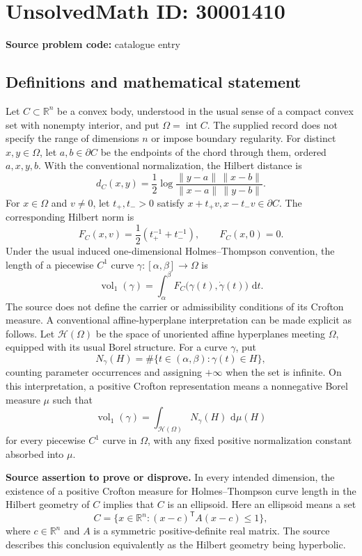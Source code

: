 \documentclass[11pt]{article}
\newcommand{\R}{\mathbb{R}}
\newcommand{\dd}{\,\mathrm{d}}
\begin{document}
\section*{UnsolvedMath ID: 30001410}
\textbf{Source problem code:} catalogue entry
\subsection{Definitions and mathematical statement}
Let \(C\subset\R^n\) be a convex body, understood in the usual sense of a compact convex set with nonempty interior, and put \(\Omega=\operatorname{int}C\). The supplied record does not specify the range of dimensions \(n\) or impose boundary regularity. For distinct \(x,y\in\Omega\), let \(a,b\in\partial C\) be the endpoints of the chord through them, ordered \(a,x,y,b\). With the conventional normalization, the Hilbert distance is
\[
 d_C(x,y)=\frac12\log\frac{\lVert y-a\rVert\,\lVert x-b\rVert}{\lVert x-a\rVert\,\lVert y-b\rVert}.
\]
For \(x\in\Omega\) and \(v\ne0\), let \(t_+,t_->0\) satisfy \(x+t_+v,x-t_-v\in\partial C\). The corresponding Hilbert norm is
\[
 F_C(x,v)=\frac12\left(t_+^{-1}+t_-^{-1}\right),\qquad F_C(x,0)=0.
\]
Under the usual induced one-dimensional Holmes--Thompson convention, the length of a piecewise \(C^1\) curve \(\gamma:[\alpha,\beta]\to\Omega\) is
\[
 \operatorname{vol}_1(\gamma)=\int_\alpha^\beta F_C\bigl(\gamma(t),\dot\gamma(t)\bigr)\,\dd t.
\]
The source does not define the carrier or admissibility conditions of its Crofton measure. A conventional affine-hyperplane interpretation can be made explicit as follows. Let \(\mathcal H(\Omega)\) be the space of unoriented affine hyperplanes meeting \(\Omega\), equipped with its usual Borel structure. For a curve \(\gamma\), put
\[
 N_\gamma(H)=\#\{t\in(\alpha,\beta):\gamma(t)\in H\},
\]
counting parameter occurrences and assigning \(+\infty\) when the set is infinite. On this interpretation, a positive Crofton representation means a nonnegative Borel measure \(\mu\) such that
\[
 \operatorname{vol}_1(\gamma)=\int_{\mathcal H(\Omega)}N_\gamma(H)\,\dd\mu(H)
\]
for every piecewise \(C^1\) curve in \(\Omega\), with any fixed positive normalization constant absorbed into \(\mu\).

\textbf{Source assertion to prove or disprove.} In every intended dimension, the existence of a positive Crofton measure for Holmes--Thompson curve length in the Hilbert geometry of \(C\) implies that \(C\) is an ellipsoid. Here an ellipsoid means a set
\[
 C=\{x\in\R^n:(x-c)^{\mathsf T}A(x-c)\leq1\},
\]
where \(c\in\R^n\) and \(A\) is a symmetric positive-definite real matrix. The source describes this conclusion equivalently as the Hilbert geometry being hyperbolic.
\end{document}
